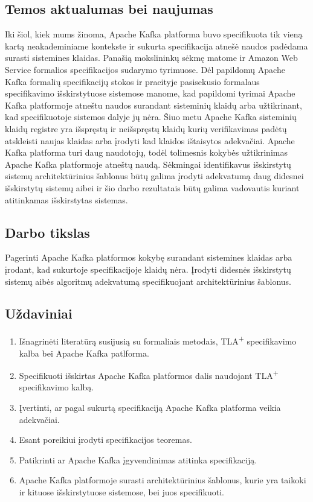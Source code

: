 \documentclass{VUMIFPSmagistrinis}
\begin{document}
	\subsection{Temos aktualumas bei naujumas}
		Iki šiol, kiek mums žinoma, Apache Kafka platforma buvo specifikuota tik vieną kartą neakademiniame kontekste ir sukurta specifikacija atnešė naudos padėdama surasti sistemines klaidas.
		Panašią mokslininkų sėkmę matome ir Amazon Web Service formalios specifikacijos sudarymo tyrimuose.
		Dėl papildomų Apache Kafka formalių specifikacijų stokos ir praeityje pasisekusio formalaus specifikavimo išskirstytuose sistemose manome, kad papildomi tyrimai Apache Kafka platformoje atneštu naudos surandant sisteminių klaidų arba užtikrinant, kad specifikuotoje sistemos dalyje jų nėra.
		Šiuo metu Apache Kafka sisteminių klaidų registre yra išspręstų  ir neišspręstų  klaidų kurių verifikavimas padėtų atskleisti naujas klaidas arba įrodyti kad klaidos ištaisytos adekvačiai.
		Apache Kafka platforma turi daug naudotojų, todėl tolimesnis kokybės užtikrinimas Apache Kafka platformoje atneštų naudą.
		Sėkmingai identifikavus išskirstytų sistemų architektūrinius šablonus būtų galima įrodyti adekvatumą daug didesnei išskirstytų sistemų aibei ir šio darbo rezultatais būtų galima vadovautis kuriant atitinkamas išskirstytas sistemas. 
	
	\subsection{Darbo tikslas}
		Pagerinti Apache Kafka platformos kokybę surandant sistemines klaidas arba įrodant, kad sukurtoje specifikacijoje klaidų nėra.
		Įrodyti didesnės išskirstytų sistemų aibės algoritmų adekvatumą specifikuojant architektūrinius šablonus.
	
	\subsection{Uždaviniai}
		\begin{enumerate}
			\item{Išnagrinėti literatūrą susijusią su formaliais metodais, TLA\textsuperscript{+} specifikavimo kalba bei Apache Kafka patlforma.}
			\item{Specifikuoti išskirtas Apache Kafka platformos dalis naudojant TLA\textsuperscript{+} specifikavimo kalbą.}
			\item{Įvertinti, ar pagal sukurtą specifikaciją Apache Kafka platforma veikia adekvačiai.}
			\item{Esant poreikiui įrodyti specifikacijos teoremas.}
			\item{Patikrinti ar Apache Kafka įgyvendinimas atitinka specifikaciją.}
			\item{Apache Kafka platformoje surasti architektūrinius šablonus, kurie yra taikoki ir kituose išskirstytuose sistemose, bei juos specifikuoti.}
		\end{enumerate}
	
\end{document}
